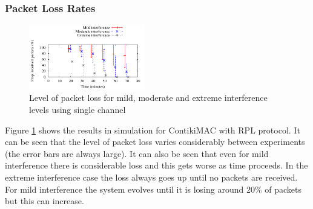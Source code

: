 
\subsubsection{Packet Loss Rates}

\begin{figure}
\centering
\includegraphics[width=0.45\textwidth]{figures/single_channel.pdf}
\caption{Level of packet loss for mild, moderate and extreme interference levels using single channel}
\label{fig:interference}
\end{figure}

Figure \ref{fig:interference} shows the results in simulation for ContikiMAC with RPL protocol. It can be seen that the level of packet loss varies considerably between experiments (the error bars are always large). It can also be seen that even for mild interference there is considerable loss and this gets worse as time proceeds. In the extreme interference case the loss always goes up until no packets are received. For mild interference the system evolves until it is losing around 20\% of packets but this can increase.

